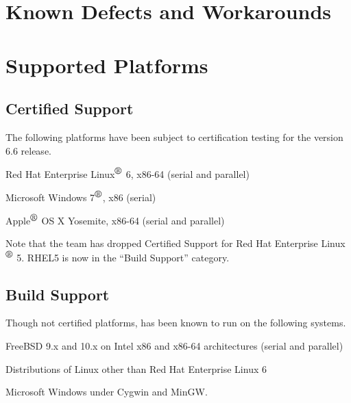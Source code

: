 \documentclass{article}
\begin{document}
%


\newpage
\section{Known Defects and Workarounds}



\newpage
\section{Supported Platforms}
\subsection*{Certified Support}
The following platforms have been subject to certification testing for the
\Xyce{} version 6.6 release.
\begin{XyceItemize}
  \item Red Hat Enterprise Linux${}^{\mbox{\textregistered}}$ 6, x86-64 (serial and parallel)
  \item Microsoft Windows 7${}^{\mbox{\textregistered}}$, x86 (serial)
  \item Apple${}^{\mbox{\textregistered}}$ OS X Yosemite, x86-64 (serial and parallel)
\end{XyceItemize}
Note that the \Xyce{} team has dropped Certified Support for Red Hat
Enterprise Linux${}^{\mbox{\textregistered}}$ 5. RHEL5 is now in the
``Build Support'' category.

\subsection*{Build Support}
Though not certified platforms, \Xyce{} has been known to run on the following
systems.
\begin{XyceItemize}
  \item FreeBSD 9.x and 10.x on Intel x86 and x86-64 architectures (serial and parallel)
  \item Distributions of Linux other than Red Hat Enterprise Linux 6
  \item Microsoft Windows under Cygwin and MinGW.
\end{XyceItemize}
\end{document}
